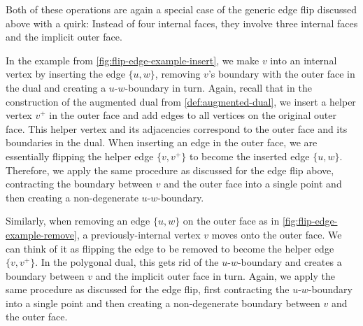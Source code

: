 Both of these operations are again a special case of the generic edge flip discussed above with a quirk:
Instead of four internal faces, they involve three internal faces and the implicit outer face.

In the example from \cref{fig:flip-edge-example-insert}, we make $v$ into an internal vertex by inserting the edge $\{u,w\}$, removing $v$'s boundary with the outer face in the dual and creating a $u$-$w$-boundary in turn.
Again, recall that in the construction of the augmented dual from \cref{def:augmented-dual}, we insert a helper vertex $v^+$ in the outer face and add edges to all vertices on the original outer face.
This helper vertex and its adjacencies correspond to the outer face and its boundaries in the dual.
When inserting an edge in the outer face, we are essentially flipping the helper edge $\{v,v^+\}$ to become the inserted edge $\{u,w\}$.
Therefore, we apply the same procedure as discussed for the edge flip above, contracting the boundary between $v$ and the outer face into a single point and then creating a non-degenerate $u$-$w$-boundary.

Similarly, when removing an edge $\{u,w\}$ on the outer face as in \cref{fig:flip-edge-example-remove}, a previously-internal vertex $v$ moves onto the outer face.
We can think of it as flipping the edge to be removed to become the helper edge $\{v,v^+\}$.
In the polygonal dual, this gets rid of the $u$-$w$-boundary and creates a boundary between $v$ and the implicit outer face in turn.
Again, we apply the same procedure as discussed for the edge flip, first contracting the $u$-$w$-boundary into a single point and then creating a non-degenerate boundary between $v$ and the outer face.

